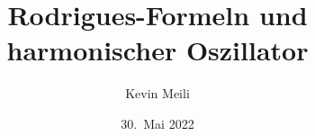 %
%
%


\beamertemplatenavigationsymbolsempty
\title[QM]{Rodrigues-Formeln und harmonischer Oszillator}
\author[K.~Meili]{Kevin Meili}
\date[]{30.~Mai 2022}

